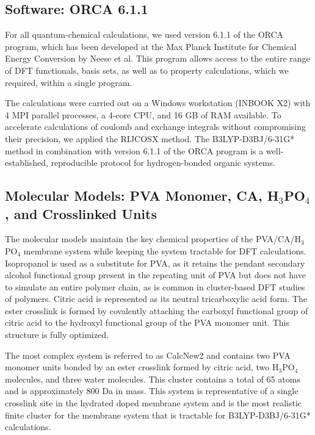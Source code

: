 \documentclass[12pt,a4paper]{report}
\begin{document}
\subsection{Software: ORCA 6.1.1}
For all quantum-chemical calculations, we used version 6.1.1 of the ORCA program, which has been developed at the Max Planck Institute for Chemical Energy Conversion by Neese et al.\cite{77,78,79} This program allows access to the entire range of DFT functionals, basis sets, as well as to property calculations, which we required, within a single program.

The calculations were carried out on a Windows workstation (INBOOK X2) with 4 MPI parallel processes, a 4-core CPU, and 16 GB of RAM available. To accelerate calculations of coulomb and exchange integrals without compromising their precision, we applied the RIJCOSX method.\cite{80} The B3LYP-D3BJ/6-31G* method in combination with version 6.1.1 of the ORCA program is a well-established, reproducible protocol for hydrogen-bonded organic systems.

\subsection{Molecular Models: PVA Monomer, CA, H\(_3\)PO\(_4\), and Crosslinked Units}
The molecular models maintain the key chemical properties of the PVA/CA/H\(_3\)PO\(_4\) membrane system while keeping the system tractable for DFT calculations. Isopropanol is used as a substitute for PVA, as it retains the pendant secondary alcohol functional group present in the repeating unit of PVA but does not have to simulate an entire polymer chain, as is common in cluster-based DFT studies of polymers.\cite{18,19} Citric acid is represented as its neutral tricarboxylic acid form. The ester crosslink is formed by covalently attaching the carboxyl functional group of citric acid to the hydroxyl functional group of the PVA monomer unit. This structure is fully optimized.

The most complex system is referred to as CalcNew2 and contains two PVA monomer units bonded by an ester crosslink formed by citric acid, two H\(_3\)PO\(_4\) molecules, and three water molecules. This cluster contains a total of 65 atoms and is approximately 800 Da in mass. This system is representative of a single crosslink site in the hydrated doped membrane system and is the most realistic finite cluster for the membrane system that is tractable for B3LYP-D3BJ/6-31G* calculations.
\end{document}
